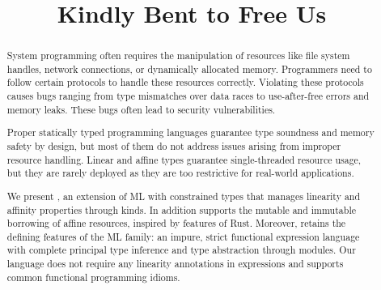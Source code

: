 \documentclass[acmsmall,review,anonymous,table]{acmart}
\begin{document}
\title{Kindly Bent to Free Us}
\begin{abstract}
  System programming often requires the manipulation of resources like
  file system handles, network connections, or dynamically allocated
  memory. Programmers need to follow certain protocols to handle
  these resources correctly. Violating these protocols causes bugs
  ranging from type mismatches over data races to use-after-free 
  errors and memory leaks. These bugs often lead to security  vulnerabilities.

  Proper statically typed programming languages guarantee type soundness and memory 
  safety by design, but most of them do not address issues arising
  from improper resource handling. 
  Linear and affine types guarantee single-threaded resource usage,
  but they are rarely deployed as they are too restrictive for real-world applications.

  We present \lang, an extension of ML with constrained types that
  manages linearity and affinity properties through kinds. In addition
  \lang{} supports the mutable and immutable borrowing of affine
  resources, inspired by features of Rust.
  Moreover, \lang{} retains the defining features of the ML family:
  an impure, strict functional expression language with complete principal type
  inference and type abstraction through modules.
  Our language does not require any linearity annotations in
  expressions and supports common functional programming idioms.
\end{abstract}


\maketitle













\end{document}

